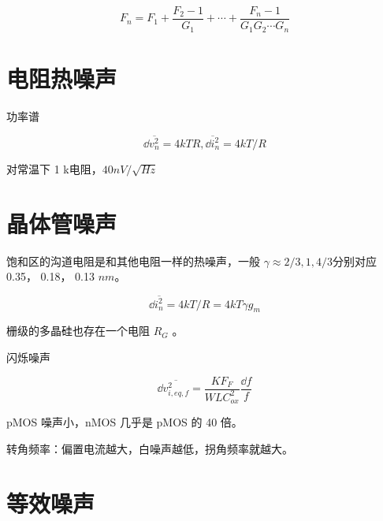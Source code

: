 \documentclass[cn,11pt,chinese,black,simple]{../elegantbook}
\begin{document}
\[F_n = F_1 + \frac{F_2 - 1}{G_1} + \cdots + \frac{F_n - 1}{G_1 G_2 \cdots G_n}\]

\section{电阻热噪声}

功率谱

\[{\dd{}\overline{v_n^2} = 4 k T R}, \overline{\dd{i_n^2}} = 4kT/R\]

对常温下 1 k电阻，\(40 nV/\sqrt{Hz}\)
\section{晶体管噪声}

饱和区的沟道电阻是和其他电阻一样的热噪声，一般 \(\gamma \approx 2/3, 1, 4/3\)分别对应 0.35， 0.18， 0.13 \(nm\)。

\[\dd{\overline{i_n^2}} = 4 k T / R = 4 k T \gamma g_m\]

栅级的多晶硅也存在一个电阻 \(R_G\) 。

闪烁噪声 

\[\dd{\overline{v_{i,eq,f}^2}} = \frac{KF_F}{WLC_{ox}^2}\frac{\dd{f}}{f}\]

pMOS 噪声小，nMOS 几乎是 pMOS 的 40 倍。

转角频率：偏置电流越大，白噪声越低，拐角频率就越大。

\section{等效噪声}



\section{}

\let\chapname\undefined
\ifx\mainclass\undefined
\end{document}
